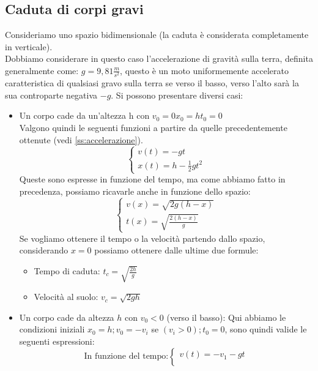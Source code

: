 \documentclass[a4paper,12pt]{report}
\begin{document}
	\subsection{Caduta di corpi gravi}
	Consideriamo uno spazio bidimensionale (la caduta è considerata completamente in verticale).\\
	Dobbiamo considerare in questo caso l'accelerazione di gravità sulla terra, definita generalmente come: $g = 9,81\frac{m}{s^2}$, questo è un moto uniformemente accelerato caratteristica di qualsiasi gravo sulla terra se verso il basso, verso l'alto sarà la sua controparte negativa $-g$. Si possono presentare diversi casi:
	\begin{itemize}
		\item Un corpo cade da un'altezza h con $v_0 = 0$\;\;\;$x_0 = h$\;\;\;$t_0 = 0$\\Valgono quindi le seguenti funzioni a partire da quelle precedentemente ottenute (vedi \ref{ss:accelerazione}).
		\begin{equation}
			\begin{cases}
				v(t) = -gt	\\
				x(t) = h - \frac{1}{2}gt^2
			\end{cases}
		\end{equation}
		Queste sono espresse in funzione del tempo, ma come abbiamo fatto in precedenza, possiamo ricavarle anche in funzione dello spazio:
		\begin{equation}
			\begin{cases}
				v(x) = \sqrt{2g(h-x)}	\\
				t(x) = \sqrt{\frac{2(h-x)}{g}}
			\end{cases}
		\end{equation}
		Se vogliamo ottenere il tempo o la velocità partendo dallo spazio, considerando $x = 0$ possiamo ottenere dalle ultime due formule:
		\begin{itemize}
			\item Tempo di caduta: $t_c = \sqrt{\frac{2h}{g}}$
			\item Velocità al suolo: $v_c = \sqrt{2gh}$
		\end{itemize}
		\item Un corpo cade da altezza $h$ con $v_0 < 0$ (verso il basso): Qui abbiamo le condizioni iniziali $x_0 = h;$\;\;\;$v_0 = -v_i$ se $(v_i > 0);$\;\;\;$t_0 = 0$, sono quindi valide le seguenti espressioni:
		\begin{equation}
			\text{In funzione del tempo:}
			\begin{cases}
				v(t) = -v_1 - gt\\

\end{cases}
\end{equation}
\end{itemize}
\end{document}
